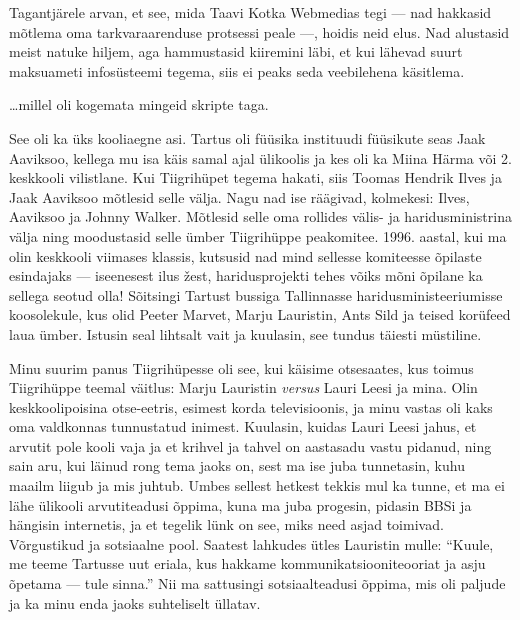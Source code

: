 Tagantjärele arvan, et see, mida Taavi Kotka 
Webmedias tegi --- nad hakkasid 
mõtlema oma tarkvaraarenduse protsessi peale ---, hoidis neid elus. 
Nad alustasid meist natuke hiljem, aga hammustasid kiiremini läbi, et kui 
lähevad suurt maksuameti infosüsteemi tegema, siis ei peaks seda veebilehena 
käsitlema. 


\ldots millel oli kogemata mingeid skripte taga.


See oli ka üks kooliaegne asi. Tartus oli füüsika 
instituudi füüsikute seas Jaak 
Aaviksoo, kellega mu isa käis samal ajal 
ülikoolis ja kes oli ka Miina Härma või 
2. keskkooli vilistlane. Kui Tiigrihüpet tegema hakati, siis Toomas Hendrik 
Ilves ja Jaak Aaviksoo mõtlesid selle välja. Nagu nad ise räägivad, kolmekesi: Ilves, Aaviksoo 
ja Johnny Walker. Mõtlesid selle oma rollides välis- ja 
haridusministrina välja ning moodustasid selle ümber Tiigrihüppe peakomitee. 
1996. aastal, kui ma olin keskkooli viimases klassis, kutsusid nad mind sellesse 
komiteesse õpilaste esindajaks --- iseenesest ilus žest, 
haridusprojekti tehes võiks mõni õpilane ka sellega seotud olla! Sõitsingi Tartust bussiga Tallinnasse haridusministeeriumisse 
koosolekule, kus olid Peeter Marvet, Marju 
Lauristin, Ants Sild ja 
teised korüfeed laua ümber. Istusin seal 
lihtsalt vait ja kuulasin, see tundus täiesti müstiline. 

Minu suurim panus Tiigrihüpesse oli see, kui käisime otsesaates, kus toimus Tiigrihüppe 
teemal väitlus: Marju Lauristin \emph{versus} 
Lauri Leesi ja mina. Olin keskkoolipoisina otse-eetris, esimest korda 
televisioonis, ja minu vastas oli kaks oma 
valdkonnas tunnustatud inimest. Kuulasin, kuidas Lauri Leesi 
jahus, et arvutit pole kooli vaja ja et krihvel ja tahvel 
on aastasadu vastu pidanud, ning sain aru, kui läinud rong tema
jaoks on, sest ma ise juba tunnetasin, kuhu maailm liigub ja mis juhtub. Umbes sellest hetkest tekkis mul ka tunne, 
et ma ei lähe ülikooli arvutiteadusi õppima, kuna ma juba progesin, pidasin
BBSi ja hängisin internetis, ja et tegelik lünk on see, miks need 
asjad toimivad. Võrgustikud ja sotsiaalne pool. Saatest lahkudes ütles Lauristin mulle: \enquote{Kuule, me teeme 
Tartusse uut eriala, kus hakkame kommunikatsiooniteooriat ja asju õpetama --- 
tule sinna.} Nii ma sattusingi sotsiaalteadusi õppima, mis 
oli paljude ja ka minu enda jaoks suhteliselt üllatav.

